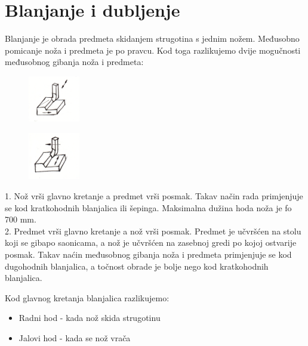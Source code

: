 \documentclass[a4paper,12pt]{article}
\numberwithin{figure}{section}
\begin{document}
\section{Blanjanje i dubljenje}
Blanjanje je obrada predmeta skidanjem strugotina s jednim nožem. Međusobno pomicanje noža i predmeta je po pravcu. Kod toga razlikujemo dvije mogučnosti međusobnog gibanja noža i predmeta:\\
\begin{figure}
  \begin{center}
  \vspace{-1cm}
    \includegraphics[width=0.2\textwidth]{image_14-1.png}
  \end{center}
\end{figure}
\begin{figure}
\vspace{-3cm}
  \begin{center}
    \includegraphics[width=0.2\textwidth]{image_14-2.png}
  \end{center}
\end{figure}
1. Nož vrši glavno kretanje a predmet vrši posmak. Takav način rada primjenjuje se kod kratkohodnih blanjalica ili šepinga. Maksimalna dužina hoda noža je fo 700 mm.\\
2. Predmet vrši glavno kretanje a nož vrši posmak. Predmet je učvršćen na stolu koji se gibapo saonicama, a nož je učvršćen na zasebnoj gredi po kojoj ostvarije posmak. Takav naćin međusobnog gibanja noža i predmeta primjenjuje se kod dugohodnih blanjalica, a točnost obrade je bolje nego kod kratkohodnih blanjalica.\par
\vspace{2cm}
\noindent Kod glavnog kretanja blanjalica razlikujemo:
\begin{itemize}
\item Radni hod - kada nož skida strugotinu
\item Jalovi hod - kada se nož vrača
\end{itemize}
\end{document}

